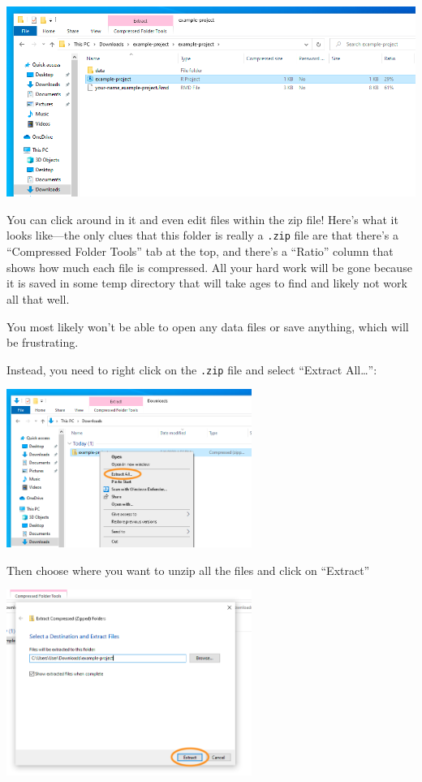 \documentclass[
  letterpaper,
  DIV=11,
  numbers=noendperiod,
  oneside]{scrreprt}
\begin{document}
\includegraphics{pics/inside-zip-windows.png}

You can click around in it and even edit files within the zip file!
Here's what it looks like---the only clues that this folder is really a
\texttt{.zip} file are that there's a ``Compressed Folder Tools'' tab at
the top, and there's a ``Ratio'' column that shows how much each file is
compressed. All your hard work will be gone because it is saved in some
temp directory that will take ages to find and likely not work all that
well.

You most likely won't be able to open any data files or save anything,
which will be frustrating.

Instead, you need to right click on the \texttt{.zip} file and select
``Extract All\ldots{}'':

\includegraphics[width=0.6\textwidth,height=\textheight]{pics/extract-windows-1.png}

Then choose where you want to unzip all the files and click on
``Extract''

\includegraphics[width=0.6\textwidth,height=\textheight]{pics/extract-windows-2.png}
\end{document}
